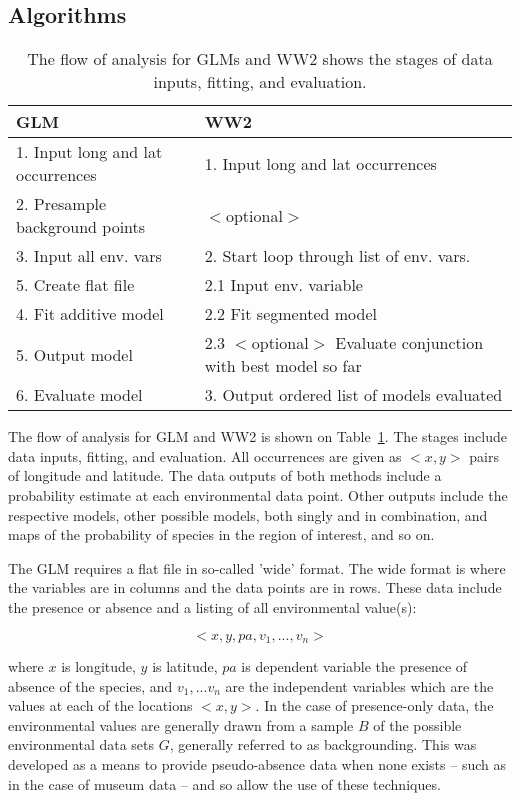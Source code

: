 \documentclass[10pt]{article}
\begin{document}
\subsection{Algorithms}
 

\begin{table}[ht]
\centering
\begin{tabular}{ll}
  \hline
GLM & WW2 \\ 
  \hline
1. Input long and lat occurrences &  1. Input long and lat occurrences \\ 
  2. Presample background points &  $<$optional$>$ \\ 
  3. Input all env. vars &  2. Start loop through list of env. vars.  \\ 
  5. Create flat file & 2.1 Input env. variable \\ 
  4. Fit additive model &  2.2 Fit segmented model \\ 
  5. Output model &  2.3 $<$optional$>$ Evaluate conjunction with best model so far \\ 
  6. Evaluate model &  3. Output ordered list of models evaluated \\ 
   \hline
\end{tabular}
\caption{ The flow of analysis for GLMs and WW2 shows the stages of data inputs, fitting, and evaluation.} 
\label{tab3}
\end{table}
The flow of analysis for GLM and WW2 is shown on Table~\ref{tab3}. The stages include data inputs, fitting, and evaluation.  All occurrences are given as $<x,y>$ pairs of longitude and latitude. The data outputs of both methods include a probability estimate at each environmental data point. Other outputs include the respective models, other possible models, both singly and in combination, and maps of the probability of species in the region of interest, and so on.
 
 The GLM  requires a flat file in so-called 'wide' format.  The wide format is where the variables are in columns and the data points are in rows. These data include the presence or absence and a listing of all environmental value(s): 

\begin{equation}
<x,y,pa,v_1,...,v_n>
\end{equation}

where $x$ is longitude, $y$ is latitude, $pa$ is dependent variable the presence of absence of the species, and $v_1,...v_n$ are the independent variables which are the values at each of the locations $<x,y>$. In the case of presence-only data, the environmental values are generally drawn from a sample $B$ of the possible environmental data sets $G$, generally referred to as backgrounding.  This was developed as a means to provide pseudo-absence data when none exists -- such as in the case of museum data -- and so allow the use of these techniques.
\end{document}

